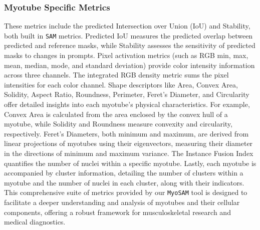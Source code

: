 \subsubsection{Myotube Specific Metrics}
These metrics include the predicted Intersection over Union (IoU) and Stability, both built in \texttt{SAM} metrics. Predicted IoU measures the predicted overlap between predicted and reference masks, while Stability assesses the sensitivity of predicted masks to changes in prompts. Pixel activation metrics (such as RGB min, max, mean, median, mode, and standard deviation) provide color intensity information across three channels. The integrated RGB density metric sums the pixel intensities for each color channel. Shape descriptors like Area, Convex Area, Solidity, Aspect Ratio, Roundness, Perimeter, Feret’s Diameter, and Circularity offer detailed insights into each myotube's physical characteristics. For example, Convex Area is calculated from the area enclosed by the convex hull of a myotube, while Solidity and Roundness measure convexity and circularity, respectively. Feret's Diameters, both minimum and maximum, are derived from linear projections of myotubes using their eigenvectors, measuring their diameter in the directions of minimum and maximum variance. The Instance Fusion Index quantifies the number of nuclei within a specific myotube. Lastly, each myotube is accompanied by cluster information, detailing the number of clusters within a myotube and the number of nuclei in each cluster, along with their indicators.
This comprehensive suite of metrics provided by our \texttt{MyoSAM} tool is designed to facilitate a deeper understanding and analysis of myotubes and their cellular components, offering a robust framework for musculoskeletal research and medical diagnostics.


